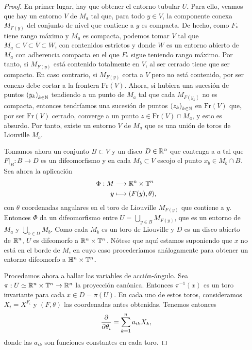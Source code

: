 \begin{proof}
  En primer lugar, hay que obtener el entorno tubular $U$. Para ello, veamos que hay un entorno $V$ de $M_a$ tal que, para todo $y\in V$, la componente conexa $M_{F(y)}$ del conjunto de nivel que contiene a $y$ es compacta. De hecho, como $F_*$ tiene rango máximo y $M_a$ es compacta, podemos tomar $V$ tal que $M_a\subset V \subset \bar{V} \subset W$, con contenidos estrictos y donde $W$ es un entorno abierto de $M_a$ con adherencia compacta en el que $F_*$ sigue teniendo rango máximo. Por tanto, si $M_{F(y)}$ está contenido totalmente en $V$, al ser cerrado tiene que ser compacto. En caso contrario, si $M_{F(y)}$ corta a $V$ pero no está contenido, por ser conexo debe cortar a la frontera $\mathrm{Fr}(V)$. Ahora, si hubiera una sucesión de puntos $\left( y_k \right)_{k\in \mathbb{N}}$ tendiendo a un punto de $M_a$ tal que cada $M_{F(y_k)}$ no es compacta, entonces tendríamos una sucesión de puntos $\left( z_k \right)_{k\in \mathbb{N}}$ en $\mathrm{Fr}(V)$ que, por ser $\mathrm{Fr}(V)$ cerrado, converge a un punto $z\in \mathrm{Fr}(V) \cap M_a$, y esto es absurdo. Por tanto, existe un entorno $V$ de $M_a$ que es una unión de toros de Liouville $M_b$. 

  Tomamos ahora un conjunto $B\subset V$ y un disco $D\in \mathbb{R}^n$ que contenga a $a$ tal que $\left. F\right|_{B}:B\rightarrow D$ es un difeomorfismo y en cada $M_b\subset V$ escojo el punto $x_b\in M_b\cap B$. Sea ahora la aplicación 
  \begin{align*}
    \Phi :M&\longrightarrow \mathbb{R}^n\times \mathbb{T}^n\\ 
      y &\longmapsto (F(y),\theta),
    \end{align*}
    con $\theta$ coordenadas angulares en el toro de Liouville $M_{F(y)}$ que contiene a $y$. Entonces $\Phi$ da un difeomorfismo entre $U=\bigcup_{y\in B}M_{F(y)}$, que es un entorno de $M_a$ y $\bigcup_{b\in D}M_b$. Como cada $M_b$ es un toro de Liouville y $D$ es un disco abierto de $\mathbb{R}^n$, $U$ es difeomorfo a $\mathbb{R}^n\times \mathbb{T}^n$.
  Nótese que aquí estamos suponiendo que $x$ no está en el borde de $M$, en cuyo caso procederíamos análogamente para obtener un entorno difeomorfo a $\mathbb{H}^n \times \mathbb{T}^n$.

 Procedamos ahora a hallar las variables de acción-ángulo. Sea $\pi:U\simeq \mathbb{R}^n \times \mathbb{T}^n \rightarrow \mathbb{R}^n$ la proyección canónica. Entonces $\pi^{-1}(x)$ es un toro invariante para cada $x \in D=\pi(U)$. En cada uno de estos toros, consideramos $X_i=X^{F_i}$ y $(F,\theta)$ las coordenadas antes obtenidas. Tenemos entonces
\[
  \frac{\partial}{\partial \theta_i} = \sum_{k=1}^n a_{ik}X_k,
\]
donde las $a_{ik}$ son funciones constantes en cada toro.


\end{proof}
